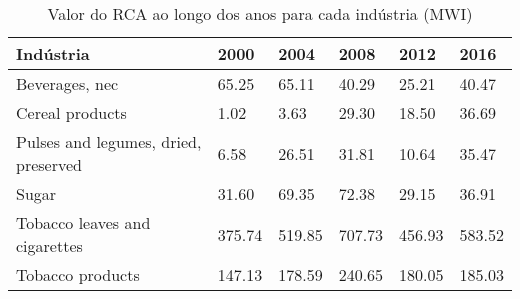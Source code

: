 \begin{table}
\centering
\caption{Valor do RCA ao longo dos anos para cada indústria (MWI)}
\begin{tabular}{p{6cm}p{1.5cm}p{1.5cm}p{1.5cm}p{1.5cm}p{1.5cm}}
\toprule
                           Indústria &   2000 &   2004 &   2008 &   2012 &   2016 \\
\midrule
                      Beverages, nec &  65.25 &  65.11 &  40.29 &  25.21 &  40.47 \\
                     Cereal products &   1.02 &   3.63 &  29.30 &  18.50 &  36.69 \\
Pulses and legumes, dried, preserved &   6.58 &  26.51 &  31.81 &  10.64 &  35.47 \\
                               Sugar &  31.60 &  69.35 &  72.38 &  29.15 &  36.91 \\
       Tobacco leaves and cigarettes & 375.74 & 519.85 & 707.73 & 456.93 & 583.52 \\
                    Tobacco products & 147.13 & 178.59 & 240.65 & 180.05 & 185.03 \\
\bottomrule
\end{tabular}
\end{table}

